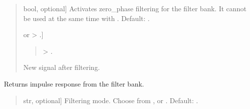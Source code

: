 \documentclass[letterpaper,10pt,english]{sphinxmanual}
\begin{document}
\begin{fulllineitems}
\begin{fulllineitems}
\begin{quote}
\begin{description}
\begin{description}
\sphinxlineitem{\sphinxstylestrong{zero\_phase}}{[}bool, optional{]}
\sphinxAtStartPar
Activates zero\_phase filtering for the filter bank. It cannot be
used at the same time with . Default: .

\end{description}

\begin{description}
\sphinxlineitem{\sphinxstylestrong{new\_sig}}{[} or  \sphinxhyphen{}\textgreater{} .{]}\begin{quote}

\sphinxAtStartPar
{} \sphinxhyphen{}\textgreater{} .
\end{quote}

\sphinxAtStartPar
New signal after filtering.

\end{description}

\end{description}\end{quote}

\end{fulllineitems}


\begin{fulllineitems}
\label{\detokenize{classes:dsptoolbox.classes.filterbank.FilterBank.get_ir}}
\pysigstartsignatures
{}
\pysigstopsignatures
\sphinxAtStartPar
Returns impulse response from the filter bank.
\begin{quote}\begin{description}
\begin{description}
\sphinxlineitem{\sphinxstylestrong{mode}}{[}str, optional{]}
\sphinxAtStartPar
Filtering mode. Choose from ,  or
. Default: .


\end{description}
\end{description}
\end{quote}
\end{fulllineitems}
\end{fulllineitems}
\end{document}

